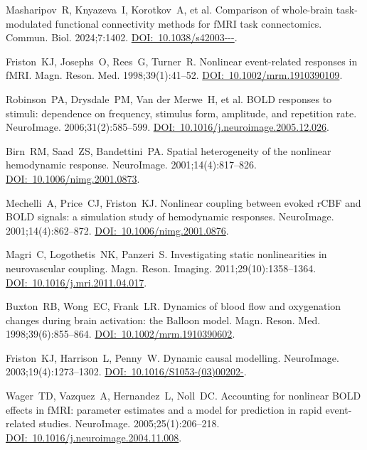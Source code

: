 \documentclass[11pt,twoside,a4paper]{article}
\begin{document}
{\begin{ltrtq}
	{Masharipov~R, Knyazeva~I, Korotkov~A, et al.} Comparison of whole-brain task-modulated functional connectivity methods for fMRI task connectomics. {Commun. Biol}. 2024;7:1402. \href{https://doi.org/10.1038/s42003-024-07088-3}{DOI:~10.1038/\allowbreak s42003---}.

	{Friston~KJ, Josephs~O, Rees~G, Turner~R.} Nonlinear event-related responses in fMRI. {Magn. Reson. Med}. 1998;39(1):41--52. \href{https://doi.org/10.1002/mrm.1910390109}{DOI:~10.1002/\allowbreak mrm.1910390109}.

	{Robinson~PA, Drysdale~PM, Van der Merwe~H, et al.} BOLD responses to stimuli: dependence on frequency, stimulus form, amplitude, and repetition rate. {NeuroImage}. 2006;31(2):585--599. \href{https://doi.org/10.1016/j.neuroimage.2005.12.026}{DOI:~10.1016/\allowbreak j.neuroimage.2005.12.026}.

	{Birn~RM, Saad~ZS, Bandettini~PA.} Spatial heterogeneity of the nonlinear hemodynamic response. {NeuroImage}. 2001;14(4):817--826. \href{https://doi.org/10.1006/nimg.2001.0873}{DOI:~10.1006/\allowbreak nimg.2001.0873}.

	{Mechelli~A, Price~CJ, Friston~KJ.} Nonlinear coupling between evoked rCBF and BOLD signals: a simulation study of hemodynamic responses. {NeuroImage}. 2001;14(4):862--872. \href{https://doi.org/10.1006/nimg.2001.0876}{DOI:~10.1006/\allowbreak nimg.2001.0876}.

	{Magri~C, Logothetis~NK, Panzeri~S.} Investigating static nonlinearities in neurovascular coupling. {Magn. Reson. Imaging}. 2011;29(10):1358--1364. \href{https://doi.org/10.1016/j.mri.2011.04.017}{DOI:~10.1016/\allowbreak j.mri.2011.04.017}.

	{Buxton~RB, Wong~EC, Frank~LR.} Dynamics of blood flow and oxygenation changes during brain activation: the Balloon model. {Magn. Reson. Med}. 1998;39(6):855--864. \href{https://doi.org/10.1002/mrm.1910390602}{DOI:~10.1002/\allowbreak mrm.1910390602}.

	{Friston~KJ, Harrison~L, Penny~W.} Dynamic causal modelling. {NeuroImage}. 2003;19(4):1273--1302. \href{https://doi.org/10.1016/S1053-8119(03)00202-7}{DOI:~10.1016/\allowbreak S1053-(03)00202-}.

	{Wager~TD, Vazquez~A, Hernandez~L, Noll~DC.} Accounting for nonlinear BOLD effects in fMRI: parameter estimates and a model for prediction in rapid event-related studies. {NeuroImage}. 2005;25(1):206--218. \href{https://doi.org/10.1016/j.neuroimage.2004.11.008}{DOI:~10.1016/\allowbreak j.neuroimage.2004.11.008}.


\end{ltrtq}}
\end{document}
